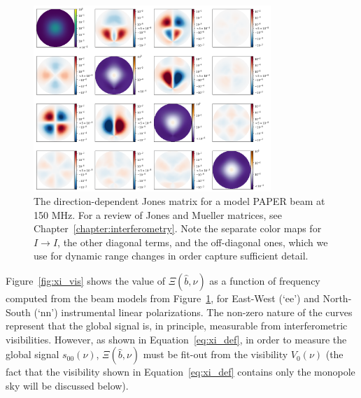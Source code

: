 \begin{figure}
\centering
\includegraphics[width=0.8\textwidth]{chapters/global_signal/figures/full_mueller_150MHz.png}
\caption[The direction-dependent Mueller matrix for a model PAPER beam at 150 MHz.]{The direction-dependent Jones matrix for a model PAPER beam at 150 MHz. For a review of Jones and Mueller matrices, see Chapter~\ref{chapter:interferometry}. Note the separate color maps for $I\rightarrow I$, the other diagonal terms, and the off-diagonal ones, which we use for dynamic range changes in order capture sufficient detail.}
\label{fig:paper_jones}
\end{figure}

Figure~\ref{fig:xi_vis} shows the value of $\Xi(\hat{b},\nu)$ as a function of frequency computed from the beam models from Figure~\ref{fig:paper_jones}, for East-West (`ee') and North-South (`nn') instrumental linear polarizations. The non-zero nature of the curves represent that the global signal is, in principle, measurable from interferometric visibilities. However, as shown in Equation~\ref{eq:xi_def}, in order to measure the global signal $s_{00}(\nu)$, $\Xi(\hat{b},\nu)$ must be fit-out from the visibility $V_0(\nu)$ (the fact that the visibility shown in Equation~\ref{eq:xi_def} contains only the monopole sky will be discussed below). 

